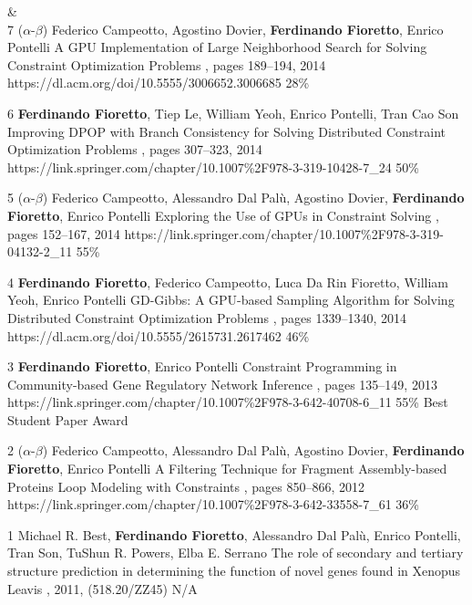 \begin{pubs}
{}&\nemph{\rule{0.5\linewidth}{0.5pt}}\\[1em]
	\confentry 
		{7} %
		{($\alpha$-$\beta$) 
		Federico Campeotto, Agostino Dovier, {\bf Ferdinando Fioretto}, Enrico Pontelli}
		{A GPU Implementation of Large Neighborhood Search for Solving Constraint Optimization Problems} 
		{\procECAI, pages 189--194, 2014}
		{https://dl.acm.org/doi/10.5555/3006652.3006685}
		{28\%}

	\confentry
		{6} %
		{{\bf Ferdinando Fioretto}, Tiep Le, William Yeoh, Enrico Pontelli, Tran Cao Son}
		{Improving DPOP with Branch Consistency for Solving Distributed Constraint Optimization Problems}
		{\procCP, pages 307--323, 2014}
		{https://link.springer.com/chapter/10.1007\%2F978-3-319-10428-7\_24}
		{50\%}
		
	\confentry
		{5} %
		{($\alpha$-$\beta$) 
		Federico Campeotto, Alessandro Dal Pal\`{u}, Agostino Dovier, {\bf Ferdinando Fioretto}, Enrico Pontelli}
		{Exploring the Use of GPUs in Constraint Solving}
		{\procPADL, pages 152--167, 2014}
		{https://link.springer.com/chapter/10.1007\%2F978-3-319-04132-2\_11}
		{55\%}

	\confentry 
		{4} %
		{{\bf Ferdinando Fioretto}, Federico Campeotto, Luca Da Rin Fioretto, William Yeoh, Enrico Pontelli} 
		{GD-Gibbs: A GPU-based Sampling Algorithm for Solving Distributed Constraint Optimization Problems} %
		{\procAAMAS, pages 1339--1340, 2014}
		{https://dl.acm.org/doi/10.5555/2615731.2617462}
		{46\%}
	
	\confentryAwd
		{3} %
		{{\bf Ferdinando Fioretto}, Enrico Pontelli} 
		{Constraint Programming in Community-based Gene Regulatory Network Inference} 
		{\procCMSB, pages 135--149, 2013}
		{https://link.springer.com/chapter/10.1007\%2F978-3-642-40708-6\_11}
		{55\%}
		{Best Student Paper Award}{}

	\confentry 
		{2} %
		{($\alpha$-$\beta$) 
		Federico Campeotto, Alessandro Dal Pal\`{u}, Agostino Dovier, {\bf Ferdinando Fioretto}, Enrico Pontelli}
		{A Filtering Technique for Fragment Assembly-based Proteins Loop Modeling with Constraints} 
		{\procCP, pages 850--866, 2012}
		{https://link.springer.com/chapter/10.1007\%2F978-3-642-33558-7\_61}
		{36\%}

	\confentry
		{1} %
		{Michael R. Best, {\bf Ferdinando Fioretto}, Alessandro Dal Pal\`{u}, Enrico Pontelli, Tran Son, TuShun R. Powers, Elba E. Serrano}
		{The role of secondary and tertiary structure prediction in determining the function of novel genes found in Xenopus Leavis}
		{, 2011, (518.20/ZZ45)}{}
		{N/A}
\end{pubs}

